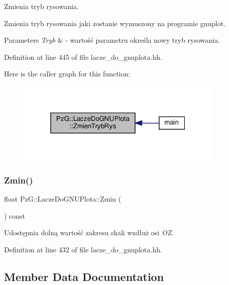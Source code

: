 Zmienia tryb rysowania. 

Zmienia tryb rysowania jaki zostanie wymuszony na programie {\ttfamily gnuplot}. 
\begin{DoxyParams}{Parameters}
{\em Tryb} & -\/ wartość parametru określa nowy tryb rysowania. \\
\hline
\end{DoxyParams}


Definition at line 445 of file lacze\+\_\+do\+\_\+gnuplota.\+hh.

Here is the caller graph for this function\+:\nopagebreak
\begin{figure}[H]
\begin{center}
\leavevmode
\includegraphics[width=280pt]{class_pz_g_1_1_lacze_do_g_n_u_plota_a10950349b348fd3a3d4143e95337527c_icgraph}
\end{center}
\end{figure}
\mbox{\label{class_pz_g_1_1_lacze_do_g_n_u_plota_a9068bd9a9873ba9c6d70016f1ae7cd7f}} 
\subsubsection{\texorpdfstring{Zmin()}{Zmin()}}
{\footnotesize\ttfamily float Pz\+G\+::\+Lacze\+Do\+G\+N\+U\+Plota\+::\+Zmin (\begin{DoxyParamCaption}{ }\end{DoxyParamCaption}) const\hspace{0.3cm}{\ttfamily [inline]}}

Udostępnia dolną wartość zakresu skali wzdłuż osi {\itshape OZ}. 

Definition at line 432 of file lacze\+\_\+do\+\_\+gnuplota.\+hh.



\subsection{Member Data Documentation}
\mbox{\label{class_pz_g_1_1_lacze_do_g_n_u_plota_a1916c5a6fecfb3554e9d5204b2f2086c}} 
